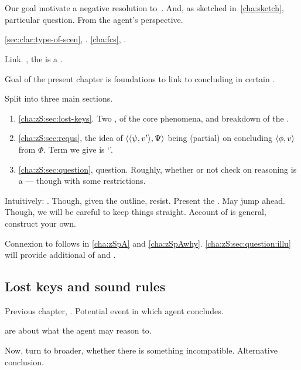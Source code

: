 \chapter{}
\label{cha:zS}

\begin{note}
  Our goal motivate a negative resolution to~\issueConstraint{}.
  And, as sketched in~\autoref{cha:sketch}, \zSN{} particular question.
  From the agent's perspective.

  \autoref{sec:clar:type-of-scen}, .
  \autoref{cha:fcs}, .

  Link.
  , the \collateral{} is a \fc{}.

  Goal of the present chapter is foundations to link  to concluding in certain .

  Split into three main sections.
  \begin{enumerate}
  \item
    \autoref{cha:zS:sec:lost-keys}.
    Two ,  of the core phenomena, and breakdown of the .
  \item
    \autoref{cha:zS:sec:requs}, the idea of \(\langle \langle \psi, v' \rangle, \Psi \rangle\) being (partial) \check{} on concluding \(\langle \phi, v \rangle\) from \(\Phi\).
    Term we give is `\requ{}'.
  \item
    \autoref{cha:zS:sec:question}, question.
    Roughly, whether or not check on reasoning is a  --- though with some restrictions.
  \end{enumerate}

  Intuitively: \qWhyV{}.
  Though, given the outline, resist.
  Present the .
  May jump ahead.
  Though, we will be careful to keep things straight.
  Account of  is general, construct your own.

  Connexion to \qWhyV{} follows in \autoref{cha:zSpA} and \autoref{cha:zSpAwhy}.
  \autoref{cha:zS:sec:question:illu} will provide additional  of \requ{} and \qzS{}.
\end{note}

\section{Lost keys and sound rules}
\label{cha:zS:sec:lost-keys}

\begin{note}
  Previous chapter, .
  Potential event in which agent concludes.

   are about what the agent may reason to.

  Now, turn to broader, whether there is something incompatible.
  Alternative conclusion.
\end{note}

